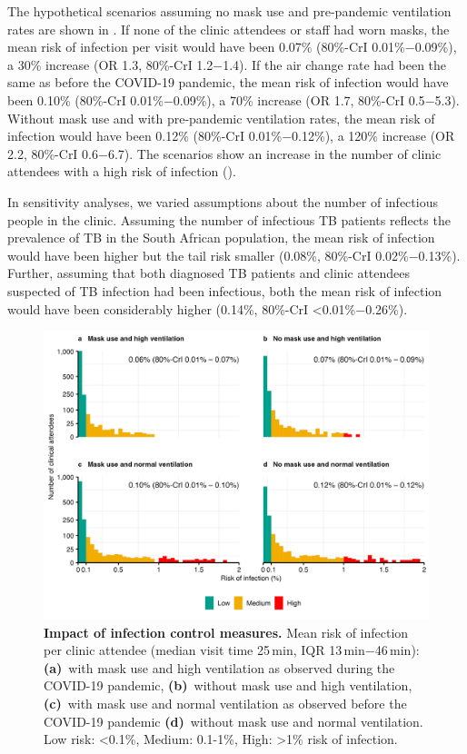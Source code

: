 \documentclass[fleqn,11pt]{wlscirep}
\begin{document}
The hypothetical scenarios assuming no mask use and pre-pandemic ventilation rates are shown in  . If none of the clinic attendees or staff had worn masks, the mean risk of infection per visit would have been 0.07\% (80\%-CrI 0.01\%$-$0.09\%), a 30\% increase (OR 1.3, 80\%-CrI 1.2$-$1.4). If the air change rate had been the same as before the COVID-19 pandemic, the mean risk of infection would have been 0.10\% (80\%-CrI 0.01\%$-$0.09\%), a 70\% increase (OR 1.7, 80\%-CrI 0.5$-$5.3). Without mask use and with pre-pandemic ventilation rates, the mean risk of infection would have been 0.12\% (80\%-CrI 0.01\%$-$0.12\%), a 120\% increase (OR 2.2, 80\%-CrI 0.6$-$6.7). The scenarios show an increase in the number of clinic attendees with a high risk of infection (). 

In sensitivity analyses, we varied assumptions about the number of infectious people in the clinic. Assuming the number of infectious TB patients reflects the prevalence of TB in the South African population, the mean risk of infection would have been higher but the tail risk smaller (0.08\%, 80\%-CrI 0.02\%$-$0.13\%). Further, assuming that both diagnosed TB patients and clinic attendees suspected of TB infection had been infectious, both the mean risk of infection would have been considerably higher (0.14\%, 80\%-CrI <0.01\%$-$0.26\%).  

\begin{figure}
    \centering
    \includegraphics{results/modeling/mean-roi-comparison.png}
    \caption{\textbf{Impact of infection control measures.} Mean risk of infection per clinic attendee (median visit time 25\,min, IQR 13\,min$-$46\,min): \textbf{(a)}~with mask use and high ventilation as observed during the COVID-19 pandemic, \textbf{(b)}~without mask use and high ventilation, \textbf{(c)}~with mask use and normal ventilation as observed before the COVID-19 pandemic  \textbf{(d)}~without mask use and normal ventilation. Low risk: <0.1\%, Medium: 0.1-1\%, High: >1\% risk of infection.}
    \label{fig:scenario-results}
\end{figure}
\end{document}
